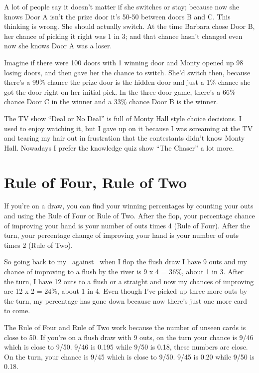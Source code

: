 A lot of people say it doesn't matter if she switches or stay; because
now she knows Door A isn't the prize door it's 50-50 between doors B
and C. This thinking is wrong. She should actually switch. At the time
Barbara chose Door B, her chance of picking it right was 1 in 3; and
that chance hasn't changed even now she knows Door A was a loser.

Imagine if there were 100 doors with 1 winning door and Monty opened
up 98 losing doors, and then gave her the chance to
switch. She'd switch then, because there's a 99\% chance the prize
door is the hidden door and just a 1\% chance she got the door right
on her initial pick. In the three door game, there's a 66\% chance
Door C in the winner and a 33\% chance Door B is the winner.

The TV show ``Deal or No Deal'' is full of Monty Hall style choice
decisions. I used to enjoy watching it, but I gave up on it because I
was screaming at the TV and tearing my hair out in frustration that
the contestants didn't know Monty Hall. Nowadays I prefer the
knowledge quiz show ``The Chaser'' a lot more.

\section{Rule of Four, Rule of Two}

If you're on a draw, you can find your winning percentages by counting
your outs and using the Rule of Four or Rule of Two. After the flop,
your percentage chance of improving your hand is your number of outs
times 4 (Rule of Four). After the turn, your percentage change of
improving your hand is your number of outs times 2 (Rule of Two).

So going back to my \fourd\tred\ against \As\Js\, when I flop the
flush draw I have 9 outs and my chance of improving to a flush by the
river is 9 x 4 = 36\%, about 1 in 3. After the turn, I have 12 outs to
a flush or a straight and now my chances of improving are 12 x 2 =
24\%, about 1 in 4. Even though I've picked up three more outs by the
turn, my percentage has gone down because now there's just one more
card to come.

The Rule of Four and Rule of Two work because the number of unseen
cards is close to 50. If you're on a flush draw with 9 outs, on the
turn your chance is 9/46 which is close to 9/50. 9/46 is 0.195 while
9/50 is 0.18, these numbers are close. On the turn, your chance is
9/45 which is close to 9/50. 9/45 is 0.20 while 9/50 is 0.18.

